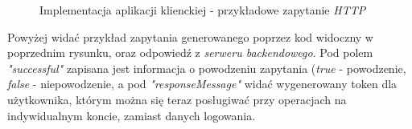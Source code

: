 \documentclass[10pt,titlepage]{article} %
\begin{document}
\begin{figure}[H]%
    \centering
    
    \qquad
    \caption[Implementacja aplikacji klienckiej - przykładowe zapytanie \textit{HTTP}]{Implementacja aplikacji klienckiej - przykładowe zapytanie \textit{HTTP}}%
\end{figure}

Powyżej widać przykład zapytania generowanego poprzez kod widoczny w poprzednim rysunku, oraz odpowiedź z \textit{serweru backendowego}. Pod polem \textit{"successful"} zapisana jest informacja o powodzeniu zapytania (\textit{true} - powodzenie, \textit{false} - niepowodzenie, a pod \textit{"responseMessage"} widać wygenerowany token dla użytkownika, którym można się teraz posługiwać przy operacjach na indywidualnym koncie, zamiast danych logowania.

\end{document}
